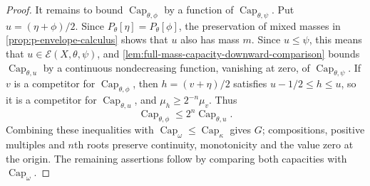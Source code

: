 \begin{proof}
It remains to bound $\operatorname{Cap}_{\theta,\phi}$ by a function of $\operatorname{Cap}_{\theta,\psi}$. Put $u=(\eta+\phi)/2$. Since $P_\theta[\eta]=P_\theta[\phi]$, the preservation of mixed masses in \cref{prop:p-envelope-calculus} shows that $u$ also has mass $m$. Since $u\leq\psi$, this means that $u\in\mathcal E(X,\theta,\psi)$, and \cref{lem:full-mass-capacity-downward-comparison} bounds $\operatorname{Cap}_{\theta,u}$ by a continuous nondecreasing function, vanishing at zero, of $\operatorname{Cap}_{\theta,\psi}$. If $v$ is a competitor for $\operatorname{Cap}_{\theta,\phi}$, then $h=(v+\eta)/2$ satisfies $u-1/2\leq h\leq u$, so it is a competitor for $\operatorname{Cap}_{\theta,u}$, and $\mu_h\geq2^{-n}\mu_v$. Thus
\[
 \operatorname{Cap}_{\theta,\phi}\leq2^n\operatorname{Cap}_{\theta,u}.
\]
Combining these inequalities with $\operatorname{Cap}_\omega\leq\operatorname{Cap}_\kappa$ gives $G$; compositions, positive multiples and $n$th roots preserve continuity, monotonicity and the value zero at the origin. The remaining assertions follow by comparing both capacities with $\operatorname{Cap}_\omega$.
\end{proof}


